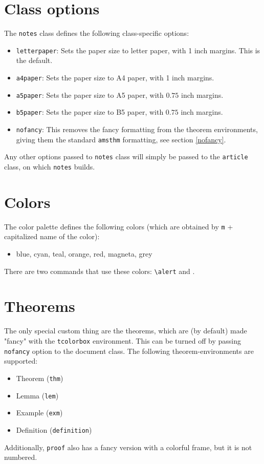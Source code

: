\documentclass[letterpaper,11pt]{notes}
\theoremstyle{definition}
\theoremstyle{plain}
\theoremstyle{remark}
\begin{document}
\section{Class options}
The \texttt{notes} class defines the following class-specific options:
\begin{itemize}
    \item \texttt{letterpaper}: Sets the paper size to letter paper, with 1 inch margins. This is the default.  
    \item \texttt{a4paper}: Sets the paper size to A4 paper, with 1 inch margins.  
    \item \texttt{a5paper}: Sets the paper size to A5 paper, with $0.75$ inch margins.  
    \item \texttt{b5paper}: Sets the paper size to B5 paper, with $0.75$ inch margins.  
    \item \texttt{nofancy}: This removes the fancy formatting from the theorem environments, giving them the standard \texttt{amsthm} formatting, see section \ref{nofancy}.  
\end{itemize}

Any other options passed to \texttt{notes} class will simply be passed to the \texttt{article} class, on which \texttt{notes} builds.

\section{Colors} \label{colors}
The color palette defines the following colors (which are obtained by \texttt{m} + capitalized name of the color):
\begin{itemize}\bfseries
    \item \textcolor{mBlue}{blue,} \textcolor{mCyan}{cyan,} \textcolor{mTeal}{teal,} \textcolor{mOrange}{orange,} \textcolor{mRed}{red,} \textcolor{mMagneta}{magneta,} \textcolor{mGrey}{grey} 
\end{itemize}

There are two commands that use these colors: \texttt{\alert{\textbackslash{}alert}} and \texttt{}.

\section{Theorems}

The only special custom thing are the theorems, which are (by default) made "fancy" with the \texttt{tcolorbox} environment. This can be turned off by passing \texttt{nofancy} option to the document class. The following theorem-environments are supported:
\begin{itemize}
    \item Theorem (\texttt{thm})
    \item Lemma (\texttt{lem})
    \item Example (\texttt{exm})
    \item Definition (\texttt{definition})
\end{itemize}
Additionally, \texttt{proof} also has a fancy version with a colorful frame, but it is not numbered.
\end{document}
